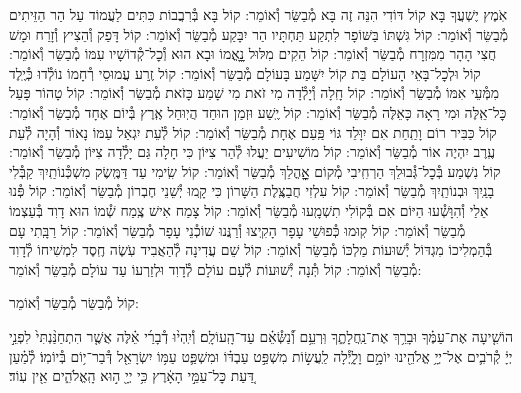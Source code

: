 \documentclass[twoside, openany, parskip=half, 11pt]{book}
\begin{document}
\begin{small}
אֹֽמֶץ יֶשְׁעֲךָ בָּא קוֹל דּוֹדִי הִנֵּה זֶה בָּא מְ֯בַשֵּׂר וְ֯אוֹמֵר:
קוֹל בָּא בְּ֯רִבֲבוֹת כִּתִּים לַעֲמוֹד עַל הַר הַזֵּיתִים מְ֯בַשֵּׂר וְ֯אוֹמֵר:
קוֹל גִּשְׁתּוֹ בַּשּׁוֹפָר לִתְקַע תַּחְתָּיו הַר יִבָּקַע מְ֯בַשֵּׂר וְ֯אוֹמֵר:
קוֹל דָּפַק וְ֯הֵצִיץ וְ֯זָרַח וּמָשׁ חֲצִי הָהָר מִמִּזְרָח מְ֯בַשֵּׂר וְ֯אוֹמֵר:
קוֹל הֵקִים מִלּוּל נׇׇׇאֳמוֹ וּבָא הוּא וְ֯כׇל־קְ֯דוֹשָׁיו עִמּוֹ מְ֯בַשֵּׂר וְ֯אוֹמֵר:
קוֹל וּלְכׇל־בָּאֵי הָעוֹלָם בַּת קוֹל יִשָּׁמַע בָּעוֹלָם מְ֯בַשֵּׂר וְ֯אוֹמֵר:
קוֹל זֶֽרַע עֲמוּסֵי רְ֯חָמוֹ נוֹלְ֯דוּ כְּ֯יֶֽלֶד מִמְּ֯עֵי אִמּוֹ מְ֯בַשֵּׂר וְ֯אוֹמֵר:
קוֹל חָֽלָה וְ֯יָלְ֯דָה מִי זֹאת מִי שָׁמַע כָּזֹאת מְ֯בַשֵּׂר וְ֯אוֹמֵר:
קוֹל טָהוֹר פָּעַל כׇּל־אֵֽלֶּה וּמִי רָאָה כָּאֵלֶּה מְ֯בַשֵּׂר וְ֯אוֹמֵר:
קוֹל יֶֽשַׁע וּזְמַן הוּחַד הֲיֽוּחַל אֶֽרֶץ בְּ֯יוֹם אֶחָד מְ֯בַשֵּׂר וְ֯אוֹמֵר:
קוֹל כַּבִּיר רוֹם וָתַֽחַת אִם יִוָּלֵד גּוֹי פַּֽעַם אֶחָת מְ֯בַשֵּׂר וְ֯אוֹמֵר:
קוֹל לְ֯עֵת יִגְאַל עַמּוֹ נָאוֹר וְ֯הָיָה לְ֯עֵת עֶֽרֶב יִהְיֶה אוֹר מְ֯בַשֵּׂר וְ֯אוֹמֵר:
קוֹל מוֹשִׁיעִים יַעֲלוּ לְ֯הַר צִיּוֹן כִּי חָלָה גַּם יָלְ֯דָה צִיּוֹן מְ֯בַשֵּׂר וְ֯אוֹמֵר:
קוֹל נִשְׁמַע בְּ֯כׇל־גְּ֯בוּלֵךְ הַרְחִֽיבִי מְ֯קוֹם אׇׇׇׇׇהֳלֵךְ מְ֯בַשֵּׂר וְ֯אוֹמֵר:
קוֹל שִֽׂימִי עַד דַּמֶּֽשֶׂק מִשְׁכְּ֯נוֹתַֽיִךְ קַבְּ֯לִי בָנַֽיִךְ וּבְנוֹתַֽיִךְ מְ֯בַשֵּׂר וְ֯אוֹמֵר:
קוֹל עִלְזִי חֲבַצֶּֽלֶת הַשָּׁרוֹן כִּי קָֽמוּ יְ֯שֵׁנֵי חֶבְרוֹן מְ֯בַשֵּׂר וְ֯אוֹמֵר:
קוֹל פְּ֯נוּ אֵלַי וְ֯הִוָּשְׁ֯עוּ הַיּוֹם אִם בְּ֯קוֹלִי תִשְׁמָֽעוּ מְ֯בַשֵּׂר וְ֯אוֹמֵר:
קוֹל צָמַח אִישׁ צֶֽמַח שְׁ֯מוֹ הוּא דָוִד בְּ֯עַצְמוֹ מְ֯בַשֵּׂר וְ֯אוֹמֵר:
קוֹל קֽוּמוּ כְּ֯פוּשֵׁי עָפָר הָקִֽיצוּ וְ֯רַנֲּנוּ שׁוֹכְ֯נֵי עָפָר מְ֯בַשֵּׂר וְ֯אוֹמֵר:
קוֹל רַבָּֽתִי עָם בְּ֯הַמְלִיכוֹ מִגְדּוֹל יְ֯שׁוּעוֹת מַלְכּוֹ מְ֯בַשֵּׂר וְ֯אוֹמֵר:
קוֹל שֵׁם עֲדִינָה לְ֯הַאֲבִיד עֹֽשֶׂה חֶֽסֶד לִמְשִׁיחוֹ לְ֯דָוִד מְ֯בַשֵּׂר וְ֯אוֹמֵר:
קוֹל תְּ֯נָה יְ֯שׁוּעוֹת לְ֯עַם עוֹלָם לְ֯דָוִד וּלְזַרְעוֹ עַד עוֹלָם מְ֯בַשֵּׂר וְ֯אוֹמֵר:

\end{small}

\begin{large}
קוֹל מְ֯בַשֵּׂר מְ֯בַשֵּׂר וְ֯אוֹמֵר:

\end{large}

הוֹשִׁ֤יעָה אֶת־עַמֶּ֗ךָ וּבָרֵ֥ךְ אֶת־נַֽחֲלָתֶ֑ךָ וּֽרְעֵ֥ם וְ֯֝נַשְּׂ֯אֵ֗ם עַד־הָֽעוֹלָֽם׃ וְ֯יִֽהְי֨וּ דְ֯בָרַ֜י אֵ֗לֶּה אֲשֶׁ֤ר הִתְחַנַּ֨נְתִּי֙ לִפְנֵ֣י יְיָ֔ קְ֯רֹבִ֛ים אֶל־יְיָ֥ אֱלֹהֵ֖ינוּ יוֹמָ֣ם וָלָ֑יְ֯לָה לַֽעֲשׂ֣וֹת מִשְׁפַּ֣ט עַבְדּ֗וֹ וּמִשְׁפַּ֛ט עַמּ֥וֹ יִשְׂרָאֵ֖ל דְּ֯בַר־י֥וֹם בְּ֯יוֹמֽוֹ׃ לְ֯מַ֗עַן דַּ֚עַת כׇּל־עַמֵּ֣י הָאָ֔רֶץ כִּ֥י יְיָ֖ ה֣וּא הָֽאֱלֹהִ֑ים אֵ֖ין עֽוֹד׃

\end{document}

